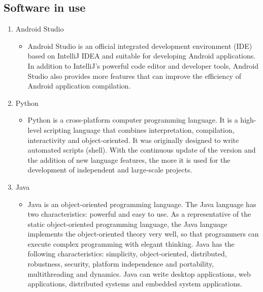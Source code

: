 \documentclass[conference]{IEEEtran}
\begin{document}
\subsection{Software in use}
\begin{enumerate}
    \item  Android Studio
        \begin{itemize}

            \item Android Studio is an official integrated development environment (IDE) based on IntelliJ IDEA and suitable for developing Android applications. In addition to IntelliJ's powerful code editor and developer tools, Android Studio also provides more features that can improve the efficiency of Android application compilation.
            
        
        \end{itemize}
        
     \item  Python
        \begin{itemize}

            \item Python is a cross-platform computer programming language. It is a high-level scripting language that combines interpretation, compilation, interactivity and object-oriented. It was originally designed to write automated scripts (shell). With the continuous update of the version and the addition of new language features, the more it is used for the development of independent and large-scale projects.
        
        
        \end{itemize}
        
         \item  Java
        \begin{itemize}

            \item Java is an object-oriented programming language. The Java language has two characteristics: powerful and easy to use. As a representative of the static object-oriented programming language, the Java language implements the object-oriented theory very well, so that programmers can execute complex programming with elegant thinking. Java has the following characteristics: simplicity, object-oriented, distributed, robustness, security, platform independence and portability, multithreading and dynamics. Java can write desktop applications, web applications, distributed systems and embedded system applications.
            

\end{itemize}
\end{enumerate}
\end{document}
